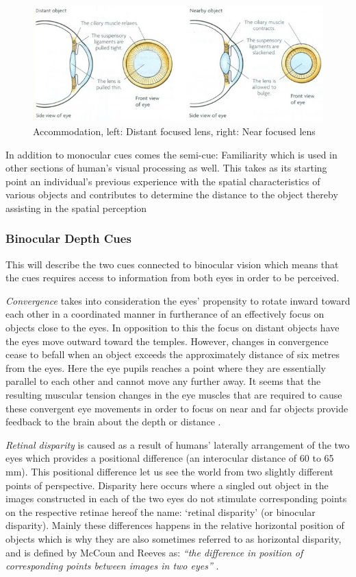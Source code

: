 \begin{figure}[h!]
   \centering
   \includegraphics[width=\textwidth]{figures/cue10.jpg}
   \caption{Accommodation, left: Distant focused lens, right: Near focused lens \cite{Biology2014}}\label{fig:cue10}
\end{figure}

In addition to monocular cues comes the semi-cue: Familiarity which is used in other sections of human’s visual processing as well. This takes as its starting point an individual’s previous experience with the spatial characteristics of various objects and contributes to determine the distance to the object thereby assisting in the spatial perception \cite{Gale}

\subsubsection{Binocular Depth Cues}
This will describe the two cues connected to binocular vision which means that the cues requires access to information from both eyes in order to be perceived.

\textit{Convergence} takes into consideration the eyes’ propensity to rotate inward toward each other in a coordinated manner in furtherance of an effectively focus on objects close to the eyes. In opposition to this the focus on distant objects have the eyes move outward toward the temples. However, changes in convergence cease to befall when an object exceeds the approximately distance of six metres from the eyes. Here the eye pupils reaches a point where they are essentially parallel to each other and cannot move any further away. It seems that the resulting muscular tension changes in the eye muscles that are required to cause these convergent eye movements in order to focus on near and far objects provide feedback to the brain about the depth or distance \cite{Gale}.

\textit{Retinal disparity} is caused as a result of humans’ laterally arrangement of the two eyes which provides a positional difference (an interocular distance of 60 to 65 mm). This positional difference let us see the world from two slightly different points of perspective. Disparity here occurs where a singled out object in the images constructed in each of the two eyes do not stimulate corresponding points on the respective retinae hereof the name: ‘retinal disparity’ (or binocular disparity).  Mainly these differences happens in the relative horizontal position of objects which is why they are also sometimes referred to as horizontal disparity, and is defined by McCoun and Reeves as: \textit{“the difference in position of corresponding points between images in two eyes”} \cite{McCoun2010}.

